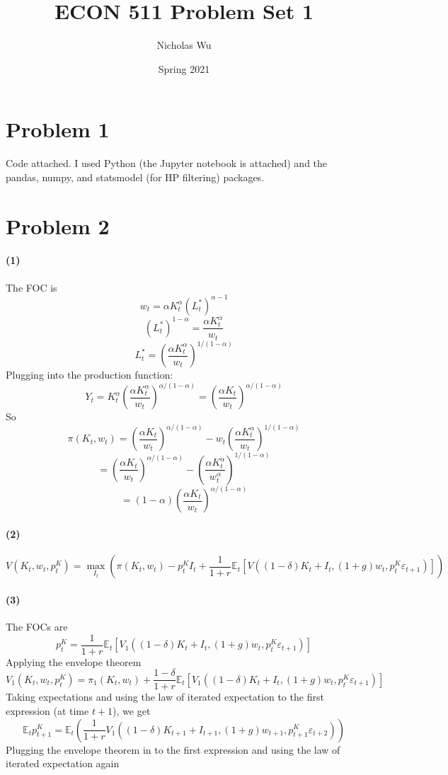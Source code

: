 \documentclass[10pt,letter]{article}
\newcommand{\problem}[1]{\section*{Problem #1}}
\newcommand{\problempart}[1]{\paragraph{#1}}
\begin{document}


\title{ECON 511 Problem Set 1}

\author{Nicholas Wu}

\date{Spring 2021}

\maketitle

\problem{1}
Code attached. I used Python (the Jupyter notebook is attached) and the pandas, numpy, and statsmodel (for HP filtering) packages.
\problem{2}
\problempart{(1)}
The FOC is
\[ w_t = \alpha K_t^{\alpha} (L^*_t)^{\alpha - 1} \]
\[ (L^*_t)^{1 - \alpha } = \frac{\alpha K_t^{\alpha}}{w_t} \]
\[ L^*_t = \left( \frac{\alpha K_t^{\alpha}}{w_t} \right)^{1/(1-\alpha)}\]
Plugging into the production function:
\[ Y_t = K_t^{\alpha} \left( \frac{\alpha K_t^{\alpha}}{w_t} \right)^{\alpha/(1-\alpha)} = \left( \frac{\alpha K_t}{w_t} \right)^{\alpha/(1-\alpha)} \]
So
\[ \pi(K_t, w_t) =  \left( \frac{\alpha K_t}{w_t} \right)^{\alpha/(1-\alpha)} - w_t\left( \frac{\alpha K_t^{\alpha}}{w_t} \right)^{1/(1-\alpha)} \]
\[ =  \left( \frac{\alpha K_t}{w_t} \right)^{\alpha/(1-\alpha)} - \left( \frac{\alpha K_t^{\alpha}}{w_t^\alpha} \right)^{1/(1-\alpha)} \]
\[ = (1 - \alpha)\left(\frac{\alpha K_t}{w_t} \right)^{\alpha/(1-\alpha)} \]
\problempart{(2)}
\[ V(K_t, w_t, p_t^K) = \max_{I_{t}}\left( \pi(K_t, w_t) - p_t^K I_{t} + \frac{1}{1+r}\mathbb{E}_t[V((1-\delta)K_t + I_t, (1+g)w_t, p^K_{t} \varepsilon_{t+1})] \right) \]
\problempart{(3)}
The FOCs are
\[ p_t^K = \frac{1}{1+r} \mathbb{E}_t[V_1((1-\delta)K_t + I_t, (1+g)w_t, p^K_{t} \varepsilon_{t+1})] \]
Applying the envelope theorem
\[ V_1(K_t, w_t, p_t^K) = \pi_1(K_t, w_t) + \frac{1-\delta}{1+r}\mathbb{E}_t[V_1((1-\delta)K_t + I_t, (1+g)w_t, p^K_{t} \varepsilon_{t+1})] \]
Taking expectations and using the law of iterated expectation to the first expression (at time $t+1$), we get
\[ \mathbb{E}_t p_{t+1}^K = \mathbb{E}_t \left(\frac{1}{1+r} V_1((1-\delta)K_{t+1} + I_{t+1}, (1+g)w_{t+1}, p^K_{t+1} \varepsilon_{t+2}) \right) \]
Plugging the envelope theorem in to the first expression and using the law of iterated expectation again
\end{document}
